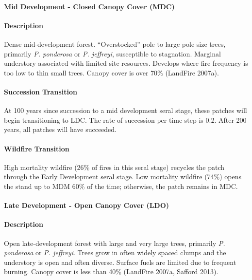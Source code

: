 \noindent\hrulefill

\paragraph*{Mid Development - Closed Canopy Cover (MDC)}

\paragraph*{Description} Dense mid-development forest. ``Overstocked'' pole to large pole size trees, primarily \emph{P. ponderosa} or \emph{P. jeffreyi}, susceptible to stagnation. Marginal understory associated with limited site resources. Develops where fire frequency is too low to thin small trees. Canopy cover is over 70\% (LandFire 2007a).

\paragraph*{Succession Transition} At 100 years since succession to a mid development seral stage, these patches will begin transitioning to LDC. The rate of succession per time step is 0.2. After 200 years, all patches will have succeeded.

\paragraph*{Wildfire Transition} High mortality wildfire (26\% of fires in this seral stage) recycles the patch through the Early Development seral stage. Low mortality wildfire (74\%) opens the stand up to MDM 60\% of the time; otherwise, the patch remains in MDC.

\noindent\hrulefill


\paragraph*{Late Development - Open Canopy Cover (LDO)}

\paragraph*{Description} Open late-development forest with large and very large trees, primarily \emph{P. ponderosa} or \emph{P. jeffreyi}. Trees grow in often widely spaced clumps and the understory is open and often diverse. Surface fuels are limited due to frequent burning. Canopy cover is less than 40\% (LandFire 2007a, Safford 2013).

